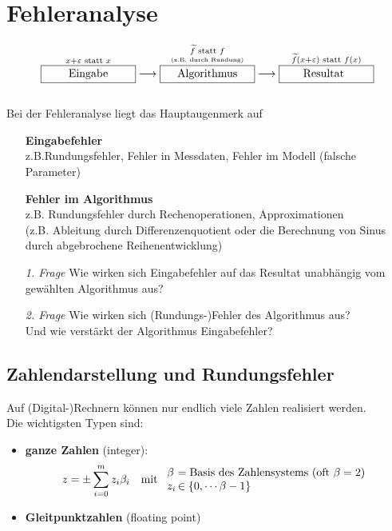 \documentclass[ngerman,fontsize=11pt, paper=a4, parskip=half, titlepage=true, toc=bib]{scrbook}
\theoremstyle{definition}
\theoremstyle{plain}
\newcommand{\sectione}[1]{\section{#1} \setcounter{equation}{0}}
\begin{document}
\chapter{Fehleranalyse} \label{3}
% 
\begin{align*}
  \overset{x+\varepsilon \text{ statt } x}{\framebox[3cm]{Eingabe}} \longrightarrow 
  \overset{\underset{\text{\tiny (z.B. durch Rundung)}}{\widetilde{f} \text{ statt } f}}{\framebox[3cm]{Algorithmus}} \longrightarrow
  \overset{\widetilde{f}(x+\varepsilon) \text{ statt } f(x)}{\framebox[3cm]{Resultat\phantom{g}}}
\end{align*}\\

Bei der Fehleranalyse liegt das Hauptaugenmerk auf
\begin{itemize}
\item[] \textbf{Eingabefehler}\\ z.B.Rundungsfehler, Fehler in Messdaten, Fehler im Modell (falsche Parameter)
\item[] \textbf{Fehler im Algorithmus} \\ z.B. Rundungsfehler durch Rechenoperationen, Approximationen \\
  (z.B. Ableitung durch Differenzenquotient oder die Berechnung von Sinus durch abgebrochene Reihenentwicklung)
  \\
\item[\textit{1. Frage}] Wie wirken sich Eingabefehler auf das Resultat unabhängig vom gewählten Algorithmus aus?
\item[\textit{2. Frage}]Wie wirken sich (Rundungs-)Fehler des Algorithmus aus?\\
  Und wie verstärkt der Algorithmus Eingabefehler?
\end{itemize}


\sectione{Zahlendarstellung und Rundungsfehler} \label{3.1}  
Auf (Digital-)Rechnern können nur endlich viele Zahlen realisiert werden. \\
Die wichtigsten Typen sind: 
\begin{itemize}
\item \textbf{ganze Zahlen}  (integer):
  \begin{align*}
    z&=\pm \sum_{i=0}^{m}z_i\beta_i & \text{mit }
                                      \begin{array}{l@{\,}l}
                                        \beta &= \text{Basis des Zahlensystems (oft $\beta=2$)} \\
                                        z_i &\in \{0, \cdots \beta-1\}
                                      \end{array}
  \end{align*}
\item \textbf{Gleitpunktzahlen} (floating point) 
\end{itemize}
\end{document}
